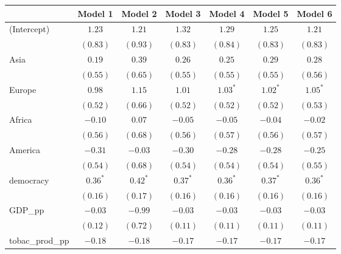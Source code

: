 
\begin{table}[!h]
\begin{center}
\begin{tabular}{l c c c c c c }
\toprule
 & Model 1 & Model 2 & Model 3 & Model 4 & Model 5 & Model 6 \\
\midrule
(Intercept)             & $1.23$       & $1.21$       & $1.32$       & $1.29$       & $1.25$       & $1.21$       \\
                        & $(0.83)$     & $(0.93)$     & $(0.83)$     & $(0.84)$     & $(0.83)$     & $(0.83)$     \\
Asia                    & $0.19$       & $0.39$       & $0.26$       & $0.25$       & $0.29$       & $0.28$       \\
                        & $(0.55)$     & $(0.65)$     & $(0.55)$     & $(0.55)$     & $(0.55)$     & $(0.56)$     \\
Europe                  & $0.98$       & $1.15$       & $1.01$       & $1.03^{*}$   & $1.02^{*}$   & $1.05^{*}$   \\
                        & $(0.52)$     & $(0.66)$     & $(0.52)$     & $(0.52)$     & $(0.52)$     & $(0.53)$     \\
Africa                  & $-0.10$      & $0.07$       & $-0.05$      & $-0.05$      & $-0.04$      & $-0.02$      \\
                        & $(0.56)$     & $(0.68)$     & $(0.56)$     & $(0.57)$     & $(0.56)$     & $(0.57)$     \\
America                 & $-0.31$      & $-0.03$      & $-0.30$      & $-0.28$      & $-0.28$      & $-0.25$      \\
                        & $(0.54)$     & $(0.68)$     & $(0.54)$     & $(0.54)$     & $(0.54)$     & $(0.55)$     \\
democracy               & $0.36^{*}$   & $0.42^{*}$   & $0.37^{*}$   & $0.36^{*}$   & $0.37^{*}$   & $0.36^{*}$   \\
                        & $(0.16)$     & $(0.17)$     & $(0.16)$     & $(0.16)$     & $(0.16)$     & $(0.16)$     \\
GDP\_pp                 & $-0.03$      & $-0.99$      & $-0.03$      & $-0.03$      & $-0.03$      & $-0.03$      \\
                        & $(0.12)$     & $(0.72)$     & $(0.11)$     & $(0.11)$     & $(0.11)$     & $(0.11)$     \\
tobac\_prod\_pp         & $-0.18$      & $-0.18$      & $-0.17$      & $-0.17$      & $-0.17$      & $-0.17$      \\

\end{tabular}
\end{center}
\end{table}
